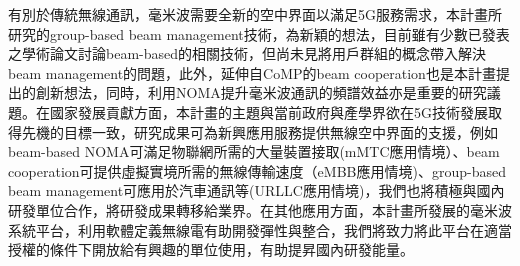 \documentclass[a4paper,12pt]{article}%
\newcommand\n{\mbox{\quad}} %
\begin{document}
{有別於傳統無線通訊，毫米波需要全新的空中界面以滿足5G服務需求，本計畫所研究的group-based beam management技術，為新穎的想法，目前雖有少數已發表之學術論文討論beam-based的相關技術，但尚未見將用戶群組的概念帶入解決beam management的問題，此外，延伸自CoMP的beam cooperation也是本計畫提出的創新想法，同時，利用NOMA提升毫米波通訊的頻譜效益亦是重要的研究議題。在國家發展貢獻方面，本計畫的主題與當前政府與產學界欲在5G技術發展取得先機的目標一致，研究成果可為新興應用服務提供無線空中界面的支援，例如beam-based NOMA可滿足物聯網所需的大量裝置接取(mMTC應用情境）、beam cooperation可提供虛擬實境所需的無線傳輸速度（eMBB應用情境)、group-based beam management可應用於汽車通訊等(URLLC應用情境)，我們也將積極與國內研發單位合作，將研發成果轉移給業界。在其他應用方面，本計畫所發展的毫米波系統平台，利用軟體定義無線電有助開發彈性與整合，我們將致力將此平台在適當授權的條件下開放給有興趣的單位使用，有助提昇國內研發能量。







%



}
\end{document}
